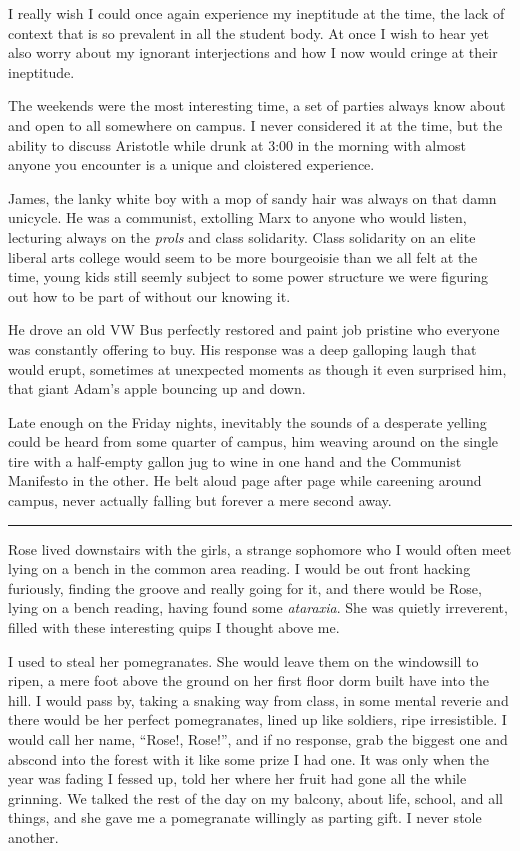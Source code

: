 \documentclass[ebook, 10pt, openright, onecolumn]{memoir}
\newcommand*\td[1]{
  \todo[inline]{
     #1 
  }
}
\newcommand*\starbreak{\fancybreak*{\Large{* * *}}}
\newcommand*\finish{\td{ ----- Finish this section -----}}
\begin{document}
I really wish I could once again experience my ineptitude at the time, the lack
of context that is so prevalent in all the student body.  At once I wish to hear
yet also worry about my ignorant interjections and how I now would cringe at their
ineptitude.  

\finish

The weekends were the most interesting time, a set of parties always know about
and open to all somewhere on campus.  I never considered it at the time, but the
ability to discuss Aristotle while drunk at 3:00 in the morning with almost
anyone you encounter is a unique and cloistered experience.  

James, the lanky white boy with a mop of sandy hair was always on that damn
unicycle.  He was a communist, extolling Marx to anyone who would listen,
lecturing always on the \textit{prols} and class solidarity.  Class solidarity
on an elite liberal arts college would seem to be more bourgeoisie than we all
felt at the time, young kids still seemly subject to some power structure we
were figuring out how to be part of without our knowing it.  

He drove an old VW Bus perfectly restored and paint job pristine who everyone
was constantly offering to buy.  His response was a deep galloping laugh that
would erupt, sometimes at unexpected moments as though it even surprised him,
that giant Adam's apple bouncing up and down.  

Late enough on the Friday nights, inevitably the sounds of a desperate yelling
could be heard from some quarter of campus, him weaving around on the single
tire with a half-empty gallon jug to wine in one hand and the Communist
Manifesto in the other.  He belt aloud page after page while careening around
campus, never actually falling but forever a mere second away.

\starbreak

Rose lived downstairs with the girls, a strange sophomore who I would often meet
lying on a bench in the common area reading.  I would be out front hacking
furiously, finding the groove and really going for it, and there would be Rose,
lying on a bench reading, having found some \textit{ataraxia}.  She was quietly
irreverent, filled with these interesting quips I thought above me.  

I used to steal her pomegranates.  She would leave them on the windowsill to
ripen, a mere foot above the ground on her first floor dorm built have into the
hill.  I would pass by, taking a snaking way from class, in some mental reverie
and there would be her perfect pomegranates, lined up like soldiers, ripe
irresistible.  I would call her name, ``Rose!, Rose!'', and if no response, grab
the biggest one and abscond into the forest with it like some prize I had one.
It was only when the year was fading I fessed up, told her where her fruit had
gone all the while grinning.  We talked the rest of the day on my balcony, about
life, school, and all things, and she gave me a pomegranate willingly as parting
gift.  I never stole another.
\end{document}
